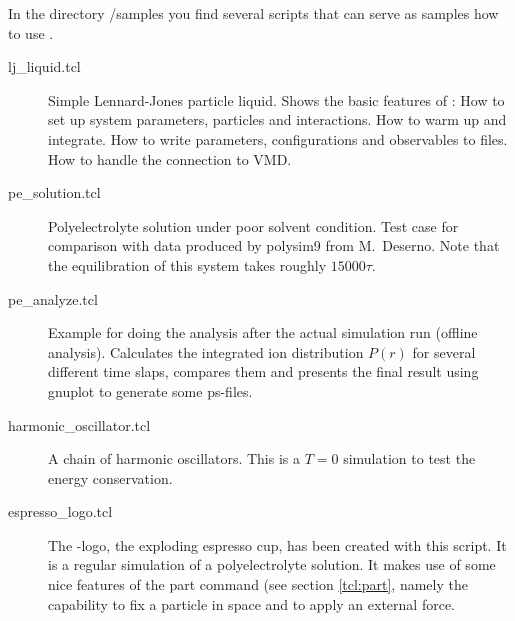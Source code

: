 In the directory \es{}/samples you find several scripts that can serve
as samples how to use \es{}.
\begin{description}
\item[lj\_liquid.tcl] Simple Lennard-Jones particle liquid. Shows the
  basic features of \es: How to set up system parameters, particles
  and interactions. How to warm up and integrate. How to write
  parameters, configurations and observables to files. How to handle
  the connection to VMD.
\item[pe\_solution.tcl] Polyelectrolyte solution under poor solvent
  condition. Test case for comparison with data produced by polysim9
  from M.~Deserno. Note that the equilibration of this system takes
  roughly $15000 \tau$.
\item[pe\_analyze.tcl] Example for doing the analysis after the actual
  simulation run (offline analysis). Calculates the integrated ion
  distribution $P(r)$ for several different time slaps, compares them
  and presents the final result using gnuplot to generate some
  ps-files.
\item[harmonic\_oscillator.tcl] A chain of harmonic oscillators. This
  is a $T=0$ simulation to test the energy conservation.
\item[espresso\_logo.tcl] The \es-logo, the exploding espresso cup,
  has been created with this script. It is a regular simulation of a
  polyelectrolyte solution. It makes use of some nice features of the
  part command (see section \vref{tcl:part}, namely the capability to
  fix a particle in space and to apply an external force.
\end{description}

